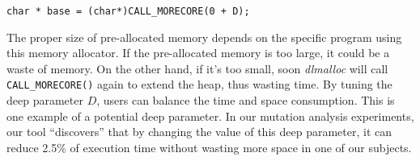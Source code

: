 \begin{lstlisting}
char * base = (char*)CALL_MORECORE(0 + D);
\end{lstlisting}

The proper size of pre-allocated memory depends on the specific program using this memory allocator. If the pre-allocated memory is too large, it could be a waste of memory. On the other hand, if it's too small, soon \emph{dlmalloc} will call {\tt CALL\_MORECORE()} again to extend the heap, thus wasting time. By tuning the deep parameter $D$, users can balance the time and space consumption. This is one example of a potential deep parameter. In our mutation analysis experiments, our tool ``discovers'' that by changing the value of this deep parameter, it can reduce 2.5\% of execution time without wasting more space in one of our subjects.


